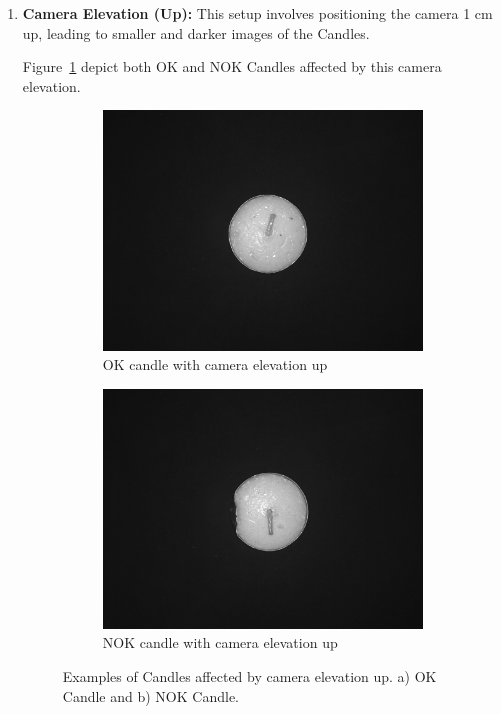 \documentclass[12pt,DIV14,BCOR12mm,a4paper,footinclude=false,headinclude,parskip=half-,twoside,openright,cleardoublepage=empty,toc=index,bibliography=totoc,listof=totoc]{scrreprt}
\numberwithin{equation}{chapter}
\begin{document}
\begin{enumerate}
	\item \textbf{Camera Elevation (Up):} This setup involves positioning the camera 1 cm up, leading to smaller and darker images of the Candles. 

Figure~\ref{fig:camera_elevation_up} depict both OK and NOK Candles affected by this camera elevation.

	\begin{figure}
		\centering
		\begin{subfigure}[b]{0.45\textwidth}
			\centering
			\includegraphics[scale=0.15]{../media/Candles-influence-camera-up-OK.png}
			\caption{OK candle with camera elevation up}
		\end{subfigure}
		\hfill
		\begin{subfigure}[b]{0.45\textwidth}
			\centering
			\includegraphics[scale=0.15]{../media/Candles-influence-camera-up-NOK.png}
			\caption{NOK candle with camera elevation up}
		\end{subfigure}
		\caption{Examples of Candles affected by camera elevation up. a) OK Candle and b) NOK Candle.}
		\label{fig:camera_elevation_up}
	\end{figure}
\end{enumerate}
\end{document}
